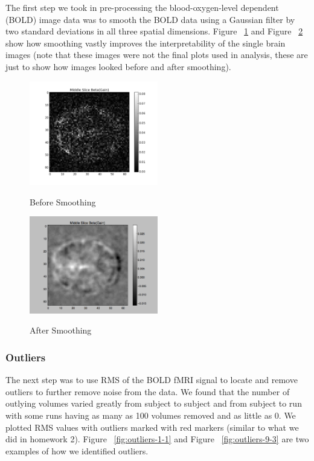 \documentclass[11pt]{article}
\begin{document}
The first step we took in pre-processing the blood-oxygen-level dependent
(BOLD) image data was to smooth the BOLD data using a Gaussian filter by two
standard deviations in all three spatial dimensions. Figure
~\ref{fig:smoothing-before} and Figure ~\ref{fig:smoothing-after} show how
smoothing vastly improves the interpretability of the single brain images (note
that these images were not the final plots used in analysis, these are just to
show how images looked before and after smoothing).

\begin{figure}[h]
\caption{Before Smoothing}
\centering
\includegraphics[width=0.5\textwidth]{smoothing-before.png}
\label{fig:smoothing-before}
\end{figure}

\begin{figure}[h]
\caption{After Smoothing}
\centering
\includegraphics[width=0.5\textwidth]{smoothing-after.png}
\label{fig:smoothing-after}
\end{figure}

\subsubsection{Outliers}

The next step was to use  RMS of the BOLD fMRI signal to locate and remove
outliers to further remove noise from the data. We found that the number of
outlying  volumes varied greatly from subject to subject and from subject to
run with some runs having as many as 100 volumes removed and as little as 0. We
plotted RMS values with outliers marked with red markers (similar to what we
did in homework 2). Figure ~\ref{fig:outliers-1-1} and Figure
~\ref{fig:outliers-9-3} are two examples of how we identified outliers.
\end{document}
